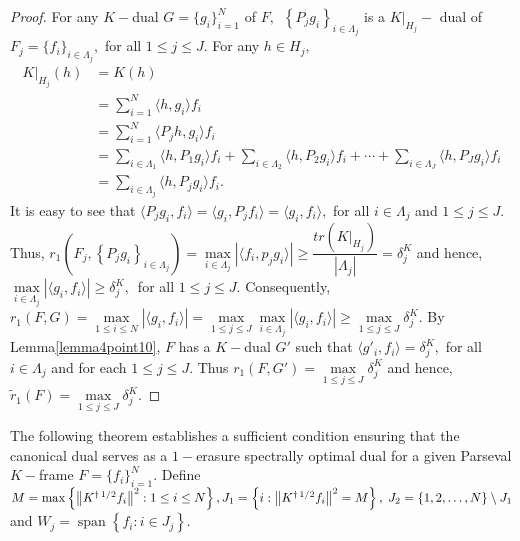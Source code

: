 \documentclass[final,1p,times]{elsarticle}
\begin{document}
	\begin{proof}
		   For any $K-$dual $G=\{g_i\}_{i=1}^N$ of $F,\,$ $\left\{P_j g_i\right\}_{i \in \Lambda_j}$ is a $K|_{H_j}-$ dual of $F_j=\{f_i\}_{i \in \Lambda_j},$ for all $1 \leq j \leq J.$ For any $h \in H_j,$
		  \begin{align*}
		  	K|_{H_j} (h) &= K(h) \\&= \sum\limits_{i=1}^N \langle h, g_i \rangle f_i \\&= \sum\limits_{i=1}^N \langle P_j h, g_i \rangle f_i \\& = \sum\limits_{i \in \Lambda_1} \langle  h, P_1 g_i \rangle f_i + \sum\limits_{i \in \Lambda_2} \langle  h, P_2 g_i \rangle f_i + \cdots +\sum\limits_{i \in \Lambda_J} \langle  h, P_J g_i \rangle f_i \\&= \sum\limits_{i \in \Lambda_j} \langle  h, P_j g_i \rangle f_i  .
		  \end{align*}
	  It is easy to see that $\langle P_j g_i,f_i \rangle = \langle  g_i, P_j f_i \rangle  =\langle  g_i,f_i \rangle ,$ for all $ i \in \Lambda_j$ and $1\leq j \leq J.$ Thus,
	  $ r_1 \left(F_j, \left\{P_j g_i\right\}_{i \in \Lambda_j} \right) = \max\limits_{i \in \Lambda_j} \left| \langle f_i, p_j g_i \rangle   \right| \geq  \dfrac{tr(K|_{H_j})}{|\Lambda_j|}= \delta_{j}^K$ and hence, $\max\limits_{i \in \Lambda_j} \left|  \langle g_i, f_i \rangle \right| \geq \delta_{j}^K,\,$ for all $1 \leq j \leq J.$ Consequently, $r_{1} (F,G) = \max\limits_{1 \leq i \leq N} \left|  \langle g_i, f_i \rangle \right| = \max\limits_{1 \leq j \leq J} \max\limits_{i \in \Lambda_j} \left|  \langle g_i, f_i \rangle \right|\geq \max\limits_{1 \leq j \leq J}\delta_{j}^K.$  By Lemma\ref{lemma4point10}, $F$ has a $K-$dual $G'$ such that $\langle g'_i, f_i \rangle = \delta_{j}^K,$ for all $i \in \Lambda_j$ and for each $1 \leq j \leq J.$  Thus  $r_{1} (F,G') =\max\limits_{1 \leq j \leq J} \delta_{j}^K$ and hence, $\tilde{r}_{1} (F) = \max\limits_{1 \leq j \leq J} \delta_{j}^K.$
	  
	  
	\end{proof}
	
	
	
	
	
	
	
	
	
	

\noindent	The following theorem establishes a sufficient condition ensuring that the canonical dual serves as a $1-$erasure spectrally optimal dual for a given Parseval \( K-\)frame \( F = \{f_i\}_{i=1}^N \). Define $M = \max \left\{ \left\| K^{\dagger\,1/2} f_i \right\|^2 : 1 \leq i \leq N \right\},\\ J_1 = \left\{ i : \left\| K^{\dagger\,1/2} f_i \right\|^2 = M \right\}, \; J_2 = \{1,2,\dots,N\} \setminus J_1$ and $W_j = \operatorname{span} \left\{ f_i : i \in J_j \right\}.$
\end{document}
